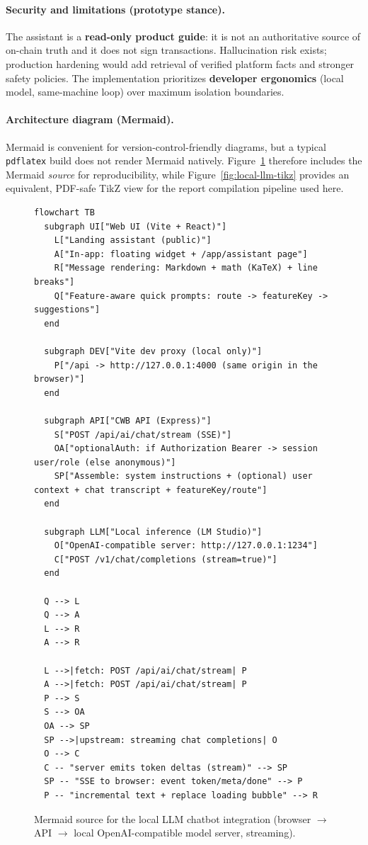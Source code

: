 \documentclass[12pt,a4paper]{report}
\begin{document}
\paragraph{Security and limitations (prototype stance).}
The assistant is a \textbf{read-only product guide}: it is not an authoritative source of on-chain truth and it does not sign transactions. Hallucination risk exists; production hardening would add retrieval of verified platform facts and stronger safety policies. The implementation prioritizes \textbf{developer ergonomics} (local model, same-machine loop) over maximum isolation boundaries.

\paragraph{Architecture diagram (Mermaid).}
Mermaid is convenient for version-control-friendly diagrams, but a typical \texttt{pdflatex} build does not render Mermaid natively. Figure~\ref{fig:local-llm-mermaid} therefore includes the Mermaid \emph{source} for reproducibility, while Figure~\ref{fig:local-llm-tikz} provides an equivalent, PDF-safe TikZ view for the report compilation pipeline used here.

\begin{figure}[H]
\centering
\begin{tcolorbox}[colback=LightBlue,colframe=PrimaryBlue!35!white,boxrule=0.8pt,arc=3pt,left=4pt,right=4pt,top=4pt,bottom=4pt]
\small
\begin{verbatim}
flowchart TB
  subgraph UI["Web UI (Vite + React)"]
    L["Landing assistant (public)"]
    A["In-app: floating widget + /app/assistant page"]
    R["Message rendering: Markdown + math (KaTeX) + line breaks"]
    Q["Feature-aware quick prompts: route -> featureKey -> suggestions"]
  end

  subgraph DEV["Vite dev proxy (local only)"]
    P["/api -> http://127.0.0.1:4000 (same origin in the browser)"]
  end

  subgraph API["CWB API (Express)"]
    S["POST /api/ai/chat/stream (SSE)"]
    OA["optionalAuth: if Authorization Bearer -> session user/role (else anonymous)"]
    SP["Assemble: system instructions + (optional) user context + chat transcript + featureKey/route"]
  end

  subgraph LLM["Local inference (LM Studio)"]
    O["OpenAI-compatible server: http://127.0.0.1:1234"]
    C["POST /v1/chat/completions (stream=true)"]
  end

  Q --> L
  Q --> A
  L --> R
  A --> R

  L -->|fetch: POST /api/ai/chat/stream| P
  A -->|fetch: POST /api/ai/chat/stream| P
  P --> S
  S --> OA
  OA --> SP
  SP -->|upstream: streaming chat completions| O
  O --> C
  C -- "server emits token deltas (stream)" --> SP
  SP -- "SSE to browser: event token/meta/done" --> P
  P -- "incremental text + replace loading bubble" --> R
\end{verbatim}
\end{tcolorbox}
\caption{Mermaid source for the local LLM chatbot integration (browser $\rightarrow$ API $\rightarrow$ local OpenAI-compatible model server, streaming).}
\label{fig:local-llm-mermaid}
\end{figure}
\end{document}
